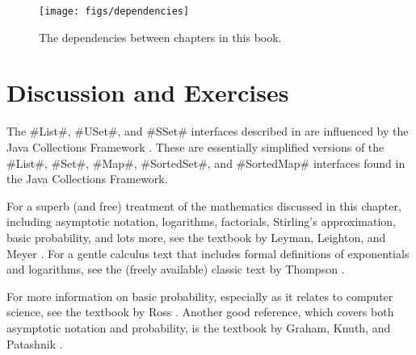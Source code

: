 \begin{figure}
  \begin{center}
    \texttt{[image: figs/dependencies]}
  \end{center}
  \caption{The dependencies between chapters in this book.}
\end{figure}

\section{Discussion and Exercises}

The #List#, #USet#, and #SSet# interfaces described in  are influenced by the Java Collections Framework \cite{oracle_collections}.   These are essentially simplified versions of the #List#, #Set#, #Map#, #SortedSet#, and #SortedMap# interfaces found in the Java Collections Framework.  

For a superb (and free) treatment of the mathematics discussed in this chapter, including asymptotic notation, logarithms, factorials, Stirling's approximation, basic probability, and lots more, see the textbook by Leyman, Leighton, and Meyer \cite{llm11}.  For a gentle calculus text that includes formal definitions of exponentials and logarithms, see the (freely available) classic text by Thompson \cite{t14}.

For more information on basic probability, especially as it relates to computer science, see the textbook by Ross \cite{r01}.  Another good reference, which covers both asymptotic notation and probability, is the textbook by Graham, Knuth, and Patashnik \cite{gkp94}.


